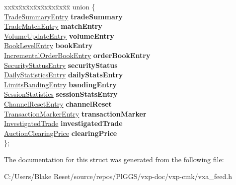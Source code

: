 \begin{DoxyCompactItemize}
\begin{tabbing}
xx\=xx\=xx\=xx\=xx\=xx\=xx\=xx\=xx\=\kill
union \{\\
\>\mbox{\hyperlink{structvxa__feed_1_1_trade_summary_entry}{TradeSummaryEntry}} {\bfseries tradeSummary}\\
\>\mbox{\hyperlink{structvxa__feed_1_1_trade_match_entry}{TradeMatchEntry}} {\bfseries matchEntry}\\
\>\mbox{\hyperlink{structvxa__feed_1_1_volume_update_entry}{VolumeUpdateEntry}} {\bfseries volumeEntry}\\
\>\mbox{\hyperlink{structvxa__feed_1_1_book_level_entry}{BookLevelEntry}} {\bfseries bookEntry}\\
\>\mbox{\hyperlink{structvxa__feed_1_1_incremental_order_book_entry}{IncrementalOrderBookEntry}} {\bfseries orderBookEntry}\\
\>\mbox{\hyperlink{structvxa__feed_1_1_security_status_entry}{SecurityStatusEntry}} {\bfseries securityStatus}\\
\>\mbox{\hyperlink{structvxa__feed_1_1_daily_statistics_entry}{DailyStatisticsEntry}} {\bfseries dailyStatsEntry}\\
\>\mbox{\hyperlink{structvxa__feed_1_1_limits_banding_entry}{LimitsBandingEntry}} {\bfseries bandingEntry}\\
\>\mbox{\hyperlink{structvxa__feed_1_1_session_statistics}{SessionStatistics}} {\bfseries sessionStatsEntry}\\
\>\mbox{\hyperlink{structvxa__feed_1_1_channel_reset_entry}{ChannelResetEntry}} {\bfseries channelReset}\\
\>\mbox{\hyperlink{structvxa__feed_1_1_transaction_marker_entry}{TransactionMarkerEntry}} {\bfseries transactionMarker}\\
\>\mbox{\hyperlink{structvxa__feed_1_1_investigated_trade}{InvestigatedTrade}} {\bfseries investigatedTrade}\\
\>\mbox{\hyperlink{structvxa__feed_1_1_auction_clearing_price}{AuctionClearingPrice}} {\bfseries clearingPrice}\\
\}; \\

\end{tabbing}\end{DoxyCompactItemize}


The documentation for this struct was generated from the following file\+:\begin{DoxyCompactItemize}
\item 
C\+:/\+Users/\+Blake Reset/source/repos/\+Pl\+G\+G\+S/vxp-\/doc/vxp-\/cmk/vxa\+\_\+feed.\+h\end{DoxyCompactItemize}

